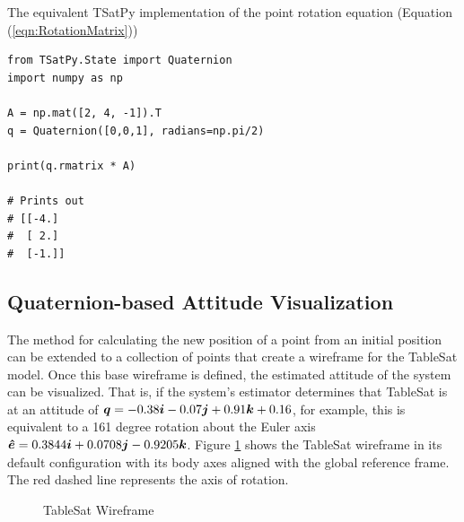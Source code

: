 The equivalent TSatPy implementation of the point rotation equation (Equation (\ref{eqn:RotationMatrix}))
\begin{singlespace}
  \begin{verbatim}
from TSatPy.State import Quaternion
import numpy as np

A = np.mat([2, 4, -1]).T
q = Quaternion([0,0,1], radians=np.pi/2)

print(q.rmatrix * A)

# Prints out
# [[-4.]
#  [ 2.]
#  [-1.]]
  \end{verbatim}
  \nocite{minted}
\end{singlespace}


\subsection{Quaternion-based Attitude Visualization}
\label{subsubsec:QuaternionbasedAttitudeVisualization}



The method for calculating the new position of a point from an initial position can be extended to a collection of points that create a wireframe for the TableSat model.  Once this base wireframe is defined, the estimated attitude of the system can be visualized.  That is, if the system's estimator determines that TableSat is at an attitude of $\boldsymbol{q} = -0.38\boldsymbol{i}-0.07\boldsymbol{j}+0.91\boldsymbol{k}+0.16$, for example, this is equivalent to a 161 degree rotation about the Euler axis $\boldsymbol{\hat{e}} = 0.3844\boldsymbol{i}+0.0708\boldsymbol{j}-0.9205\boldsymbol{k}$.  Figure \ref{fig:TSatWireframe} shows the TableSat wireframe in its default configuration with its body axes aligned with the global reference frame.  The red dashed line represents the axis of rotation.


\begin{figure}[H]
  \centerline{}
  \caption{TableSat Wireframe}
  \label{fig:TSatWireframe}
\end{figure}

